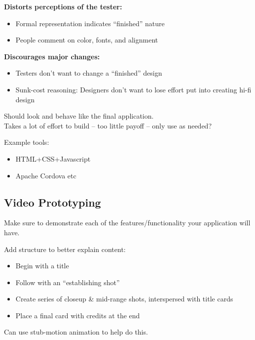 \textbf{Distorts perceptions of the tester:}
\begin{itemize}
    \item Formal representation indicates “finished” nature
    \item People comment on color, fonts, and alignment
\end{itemize}

\textbf{Discourages major changes:}
\begin{itemize}
    \item Testers don’t want to change a “finished” design
    \item Sunk-cost reasoning: Designers don’t want to lose effort put into creating hi-fi design
\end{itemize}

Should look and behave like the final application.\\
Takes a lot of effort to build -- too little payoff -- only use as needed?

Example tools: 
\begin{itemize}
    \item HTML+CSS+Javascript
    \item Apache Cordova etc
\end{itemize}

\subsection{Video Prototyping}
Make sure to demonstrate each of the features/functionality your application will have.

Add structure to better explain content:
\begin{itemize}
    \item Begin with a title
    \item Follow with an “establishing shot”
    \item Create series of closeup \& mid-range shots, interspersed with title cards
    \item Place a final card with credits at the end
\end{itemize}

Can use stub-motion animation to help do this.
